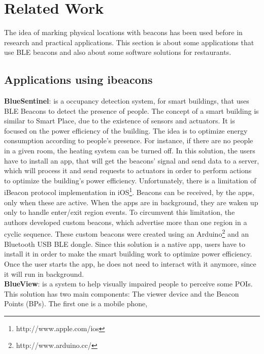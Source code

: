 
\section{Related Work}
\label{sec:related_work}
The idea of marking physical locations with beacons has been used before
in research and practical applications.
This section is about some applications that use BLE beacons and also
about some software solutions for restaurants.

\subsection{Applications using ibeacons}
\label{sub:applications_using_ibeacons}
\textbf{BlueSentinel}\cite{bluesentinel}: is a
occupancy detection system, for smart buildings,
that uses BLE Beacons to detect the presence of
people. The concept of a smart building
is similar to Smart Place,
due to the existence of sensors and actuators.
It is focused on the power efficiency of the
building. The idea is to optimize energy
consumption according to people's presence.
For instance, if there are no people in a given room,
the heating system can be turned off.
In this solution, the users have to install
an app, that will get the beacons' signal and
send data to a server, which will process it
and send requests to actuators in order to
perform actions to optimize the
building's power efficiency.
Unfortunately, there is a limitation
of iBeacon protocol implementation
in iOS\footnote{http://www.apple.com/ios}.
Beacons can be received, by the apps,
only when these are active. When the apps are in
background, they are waken up only to handle
enter/exit region events. To circumvent this
limitation, the authors developed custom
beacons, which advertise more than one region
in a cyclic sequence. These custom beacons
were created using an
Arduino\footnote{http://www.arduino.cc/}
and an Bluetooth USB BLE dongle.
Since this solution is a native app,
users have to install it in order
to make the smart building work to
optimize power efficiency.
Once the user starts the app, he does not
need to interact with it anymore, since it
will run in background.
\\
\textbf{BlueView}\cite{blueview}: is a system to help
visually impaired people to perceive some POIs.
This solution has two main components: The viewer device
and the Beacon Points (BPs). The first one is a mobile phone,

